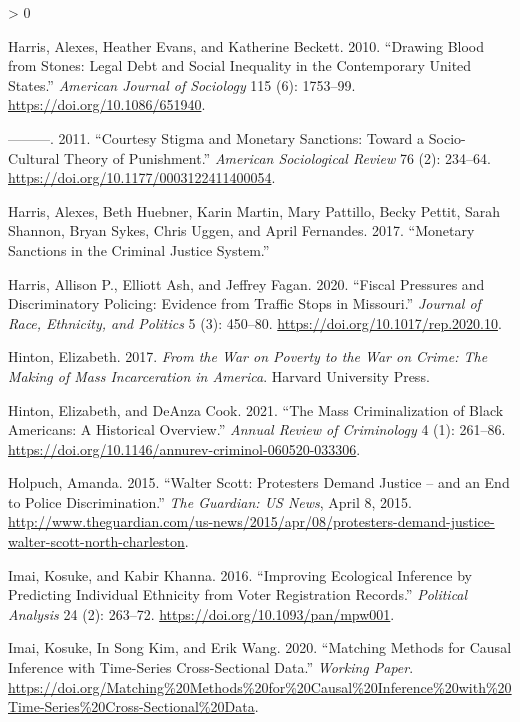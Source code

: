 \documentclass[
  12pt,
]{article}
\newlength{\cslhangindent}
\newenvironment{CSLReferences}[2] %
 {%
  \setlength{\parindent}{0pt}
  \ifodd #1 \everypar{\setlength{\hangindent}{\cslhangindent}}\ignorespaces\fi
  \ifnum #2 > 0
  \setlength{\parskip}{#2\baselineskip}
  \fi
 }%
 {}
\begin{document}
\begin{CSLReferences}{1}{0}
\leavevmode\hypertarget{ref-Harris2010}{}%
Harris, Alexes, Heather Evans, and Katherine Beckett. 2010. {``Drawing {Blood} from {Stones}: {Legal Debt} and {Social Inequality} in the {Contemporary United States}.''} \emph{American Journal of Sociology} 115 (6): 1753--99. \url{https://doi.org/10.1086/651940}.

\leavevmode\hypertarget{ref-Harris2011}{}%
---------. 2011. {``Courtesy {Stigma} and {Monetary Sanctions}: {Toward} a {Socio}-{Cultural Theory} of {Punishment}.''} \emph{American Sociological Review} 76 (2): 234--64. \url{https://doi.org/10.1177/0003122411400054}.

\leavevmode\hypertarget{ref-Harris2017}{}%
Harris, Alexes, Beth Huebner, Karin Martin, Mary Pattillo, Becky Pettit, Sarah Shannon, Bryan Sykes, Chris Uggen, and April Fernandes. 2017. {``Monetary {Sanctions} in the {Criminal Justice System}.''}

\leavevmode\hypertarget{ref-Harris2020}{}%
Harris, Allison P., Elliott Ash, and Jeffrey Fagan. 2020. {``Fiscal {Pressures} and {Discriminatory Policing}: {Evidence} from {Traffic Stops} in {Missouri}.''} \emph{Journal of Race, Ethnicity, and Politics} 5 (3): 450--80. \url{https://doi.org/10.1017/rep.2020.10}.

\leavevmode\hypertarget{ref-Hinton2017}{}%
Hinton, Elizabeth. 2017. \emph{From the {War} on {Poverty} to the {War} on {Crime}: {The Making} of {Mass Incarceration} in {America}}. {Harvard University Press}.

\leavevmode\hypertarget{ref-Hinton2021}{}%
Hinton, Elizabeth, and DeAnza Cook. 2021. {``The {Mass Criminalization} of {Black Americans}: {A Historical Overview}.''} \emph{Annual Review of Criminology} 4 (1): 261--86. \url{https://doi.org/10.1146/annurev-criminol-060520-033306}.

\leavevmode\hypertarget{ref-Holpuch2015}{}%
Holpuch, Amanda. 2015. {``Walter {Scott}: Protesters Demand Justice -- and an End to Police Discrimination.''} \emph{The Guardian: US News}, April 8, 2015. \url{http://www.theguardian.com/us-news/2015/apr/08/protesters-demand-justice-walter-scott-north-charleston}.

\leavevmode\hypertarget{ref-Imai2016}{}%
Imai, Kosuke, and Kabir Khanna. 2016. {``Improving {Ecological Inference} by {Predicting Individual Ethnicity} from {Voter Registration Records}.''} \emph{Political Analysis} 24 (2): 263--72. \url{https://doi.org/10.1093/pan/mpw001}.

\leavevmode\hypertarget{ref-Imai2020}{}%
Imai, Kosuke, In Song Kim, and Erik Wang. 2020. {``Matching {Methods} for {Causal Inference} with {Time}-{Series Cross}-{Sectional Data}.''} \emph{Working Paper}. \url{https://doi.org/Matching\%20Methods\%20for\%20Causal\%20Inference\%20with\%20Time-Series\%20Cross-Sectional\%20Data}.


\end{CSLReferences}
\end{document}
